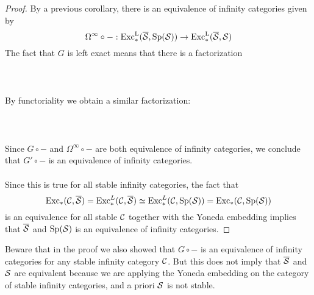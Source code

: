 \documentclass[a4paper]{article}
\begin{document}
\begin{thm}{}{}
\begin{proof}
By a previous corollary, there is an equivalence of infinity categories given by $$\Omega^\infty\circ-:\text{Exc}_\ast^\text{L}(\overline{\mathcal{S}},\text{Sp}(\mathcal{S}))\to\text{Exc}_\ast^{\text{L}}(\overline{\mathcal{S}},\mathcal{S})$$ The fact that $G$ is left exact means that there is a factorization \\~\\
\\~\\
By functoriality we obtain a similar factorization: \\~\\
\\~\\
Since $G\circ -$ and $\Omega^\infty\circ -$ are both equivalence of infinity categories, we conclude that $G'\circ -$ is an equivalence of infinity categories. \\~\\

Since this is true for all stable infinity categories, the fact that $$\text{Exc}_\ast(\mathcal{C},\overline{\mathcal{S}})=\text{Exc}_\ast^L(\mathcal{C},\overline{\mathcal{S}})\simeq\text{Exc}_\ast^L(\mathcal{C},\text{Sp}(\mathcal{S}))=\text{Exc}_\ast(\mathcal{C},\text{Sp}(\mathcal{S}))$$ is an equivalence for all stable $\mathcal{C}$ together with the Yoneda embedding implies that $\overline{\mathcal{S}}$ and $\text{Sp}(\mathcal{S})$ is an equivalence of infinity categories. 
\end{proof}
\end{thm}

Beware that in the proof we also showed that $G\circ -$ is an equivalence of infinity categories for any stable infinity category $\mathcal{C}$. But this does not imply that $\overline{\mathcal{S}}$ and $\mathcal{S}$ are equivalent because we are applying the Yoneda embedding on the category of stable infinity categories, and a priori $\mathcal{S}$ is not stable. 
\end{document}
